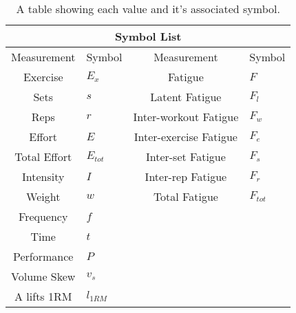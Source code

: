 \begin{table}[h]
	\centering
    \begin{tabular}{|c|l||c|l|}
	    	\hline
	    \multicolumn{4}{|c|}{Symbol List} \\
	    \hline
        Measurement & Symbol & Measurement & Symbol\\
        \hline
        Exercise & $E_x$ & Fatigue & $F$ \\
        Sets & $s$ & Latent Fatigue & $F_l$ \\
        Reps & $r$ & Inter-workout Fatigue & $F_w$ \\
        Effort & $E$ & Inter-exercise Fatigue & $F_e$ \\
        Total Effort & $E_{tot}$ & Inter-set Fatigue & $F_s$ \\
        Intensity & $I$ & Inter-rep Fatigue & $F_r$ \\
        Weight & $w$ & Total Fatigue & $F_{tot}$ \\
        Frequency & $f$ & & \\
        Time & $t$ & & \\
        Performance & $P$ & & \\
        Volume Skew & $v_s$ & & \\
        A lifts 1RM & $l_{1RM}$ & & \\
        \hline
    \end{tabular}
    \caption{A table showing each value and it's associated symbol.}
    \label{tab:P1_SymbolTable}
\end{table}